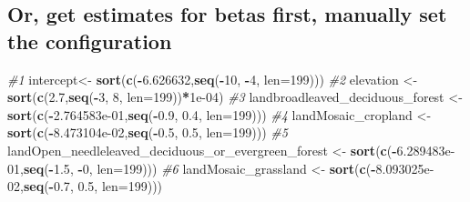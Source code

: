 \documentclass[
]{article}
\newenvironment{Shaded}{\begin{snugshade}}{\end{snugshade}}
\newcommand{\AttributeTok}[1]{\textcolor[rgb]{0.13,0.29,0.53}{#1}}
\newcommand{\CommentTok}[1]{\textcolor[rgb]{0.56,0.35,0.01}{\textit{#1}}}
\newcommand{\DecValTok}[1]{\textcolor[rgb]{0.00,0.00,0.81}{#1}}
\newcommand{\FloatTok}[1]{\textcolor[rgb]{0.00,0.00,0.81}{#1}}
\newcommand{\FunctionTok}[1]{\textcolor[rgb]{0.13,0.29,0.53}{\textbf{#1}}}
\newcommand{\NormalTok}[1]{#1}
\newcommand{\OtherTok}[1]{\textcolor[rgb]{0.56,0.35,0.01}{#1}}
\newcommand{\SpecialCharTok}[1]{\textcolor[rgb]{0.81,0.36,0.00}{\textbf{#1}}}
\begin{document}
\hypertarget{or-get-estimates-for-betas-first-manually-set-the-configuration}{%
\subsection{Or, get estimates for betas first, manually set the
configuration}\label{or-get-estimates-for-betas-first-manually-set-the-configuration}}

\begin{Shaded}
\begin{Highlighting}[]
\CommentTok{\#1}
\NormalTok{intercept}\OtherTok{\textless{}{-}} \FunctionTok{sort}\NormalTok{(}\FunctionTok{c}\NormalTok{(}\SpecialCharTok{{-}}\FloatTok{6.626632}\NormalTok{,}\FunctionTok{seq}\NormalTok{(}\SpecialCharTok{{-}}\DecValTok{10}\NormalTok{, }\SpecialCharTok{{-}}\DecValTok{4}\NormalTok{, }\AttributeTok{len=}\DecValTok{199}\NormalTok{)))}
\CommentTok{\#2}
\NormalTok{elevation  }\OtherTok{\textless{}{-}} \FunctionTok{sort}\NormalTok{(}\FunctionTok{c}\NormalTok{(}\FloatTok{2.7}\NormalTok{,}\FunctionTok{seq}\NormalTok{(}\SpecialCharTok{{-}}\DecValTok{3}\NormalTok{,  }\DecValTok{8}\NormalTok{, }\AttributeTok{len=}\DecValTok{199}\NormalTok{))}\SpecialCharTok{*}\FloatTok{1e{-}04}\NormalTok{)}
\CommentTok{\#3}
\NormalTok{landbroadleaved\_deciduous\_forest }\OtherTok{\textless{}{-}} \FunctionTok{sort}\NormalTok{(}\FunctionTok{c}\NormalTok{(}\SpecialCharTok{{-}}\FloatTok{2.764583e{-}01}\NormalTok{,}\FunctionTok{seq}\NormalTok{(}\SpecialCharTok{{-}}\FloatTok{0.9}\NormalTok{,  }\FloatTok{0.4}\NormalTok{, }\AttributeTok{len=}\DecValTok{199}\NormalTok{)))}
\CommentTok{\#4}
\NormalTok{landMosaic\_cropland }\OtherTok{\textless{}{-}} \FunctionTok{sort}\NormalTok{(}\FunctionTok{c}\NormalTok{(}\SpecialCharTok{{-}}\FloatTok{8.473104e{-}02}\NormalTok{,}\FunctionTok{seq}\NormalTok{(}\SpecialCharTok{{-}}\FloatTok{0.5}\NormalTok{,  }\FloatTok{0.5}\NormalTok{, }\AttributeTok{len=}\DecValTok{199}\NormalTok{)))  }
\CommentTok{\#5}
\NormalTok{landOpen\_needleleaved\_deciduous\_or\_evergreen\_forest }\OtherTok{\textless{}{-}} \FunctionTok{sort}\NormalTok{(}\FunctionTok{c}\NormalTok{(}\SpecialCharTok{{-}}\FloatTok{6.289483e{-}01}\NormalTok{,}\FunctionTok{seq}\NormalTok{(}\SpecialCharTok{{-}}\FloatTok{1.5}\NormalTok{,  }\SpecialCharTok{{-}}\DecValTok{0}\NormalTok{, }\AttributeTok{len=}\DecValTok{199}\NormalTok{)))  }
\CommentTok{\#6}
\NormalTok{landMosaic\_grassland }\OtherTok{\textless{}{-}} \FunctionTok{sort}\NormalTok{(}\FunctionTok{c}\NormalTok{(}\SpecialCharTok{{-}}\FloatTok{8.093025e{-}02}\NormalTok{,}\FunctionTok{seq}\NormalTok{(}\SpecialCharTok{{-}}\FloatTok{0.7}\NormalTok{,  }\FloatTok{0.5}\NormalTok{, }\AttributeTok{len=}\DecValTok{199}\NormalTok{))) }

\end{Highlighting}
\end{Shaded}
\end{document}
